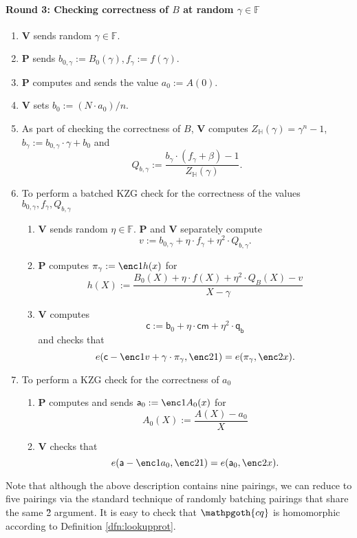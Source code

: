 \documentclass[11pt]{article} %
\newcommand{\cq}{\ensuremath{\mathpgoth{cq} }\xspace}
\newcommand{\F}{\ensuremath{\mathbb F}\xspace}
\newcommand{\cm}{\ensuremath{\mathsf{cm}}\xspace}
\newcommand{\defeq}{:=}
\newcommand{\prv}{\ensuremath{\mathsf{\mathbf{P}}}\xspace}
\newcommand{\ver}{\ensuremath{\mathsf{\mathbf{V}}}\xspace}
\newcommand{\subspace}{\ensuremath{\mathbb{H}}\xspace}
\newcommand{\witsize}{\ensuremath{n}\xspace}
\newcommand{\tabsize}{\ensuremath{N}\xspace}
\renewcommand{\a}{\ensuremath{\mathsf{a}}\xspace}
\renewcommand{\b}{\ensuremath{\mathsf{b}_0}\xspace}
\renewcommand{\c}{\ensuremath{\mathsf{c}}\xspace}
\newcommand{\qb}{\ensuremath{\mathsf{q_b}}\xspace}
\newcommand{\gamproof}{\ensuremath{\mathsf{\pi_\gamma}}\xspace}
\newcommand{\zerproof}{\ensuremath{\mathsf{\a}_0}\xspace}
\newcommand{\bgam}{\ensuremath{b_\gamma}\xspace}
\newcommand{\bzergam}{\ensuremath{b_{0,\gamma}}\xspace}
\newcommand{\qbgam}{\ensuremath{Q_{b,\gamma}}\xspace}
\newcommand{\fgam}{\ensuremath{f_{\gamma}}\xspace}
\begin{document}
	\paragraph{\textbf{Round 3:} Checking correctness of  $B$ at random $\gamma \in \F$}
 \begin{enumerate}
\item \ver sends random $\gamma \in \F$.
\item \prv sends $\bzergam \defeq B_0(\gamma),\fgam \defeq f(\gamma)$.
\item \prv computes and sends the value $a_0\defeq A(0)$.
\item \label{step:setb0}\ver  sets $b_0\defeq (\tabsize\cdot a_0)/\witsize$.
\item\label{step:setQB} As part of checking the correctness of $B$, \ver computes $ Z_\subspace(\gamma) = \gamma^\witsize -1$, $\bgam\defeq \bzergam\cdot \gamma + b_0$ and
\[\qbgam\defeq \frac{\bgam\cdot (\fgam + \beta)-1}{Z_\subspace(\gamma)}.\]
\item To perform a batched KZG check for the correctness of the values  $\bzergam,\fgam,\qbgam$
  \begin{enumerate}
   \item \ver sends random $\eta\in \F$. \prv and \ver separately compute
   \[v\defeq \bzergam +\eta\cdot\fgam + \eta^2\cdot \qbgam.\]
   \item \prv computes $\gamproof\defeq \enc1{h(x)}$ for 
   \[h(X)\defeq \frac{ B_0(X)+ \eta\cdot f(X) + \eta^2\cdot Q_B(X) -v}{X-\gamma}\]
   \item\label{step:checkKZG1} \ver computes 
   \[\c\defeq \b+\eta\cdot \cm +\eta^2\cdot \qb\]
   and checks that 
   \[e(\c-\enc1{v}+\gamma\cdot \gamproof,\enc2{1})=e(\gamproof,\enc2{x}).\]
  \end{enumerate}
\item To perform a KZG check for the correctness of $a_0$
  \begin{enumerate}
   \item \prv computes and sends $\zerproof\defeq \enc1{A_0(x)}$ for 
   \[A_0(X)\defeq \frac{A(X)-a_0}{X}\]
   \item\label{step:checkKZG2} \ver checks that 
   \[e(\a-\enc1{a_0},\enc2{1})=e(\zerproof,\enc2{x}).\]
  \end{enumerate}

\end{enumerate}

Note that although the above description contains nine pairings, we can reduce to five pairings via the standard technique of randomly batching
pairings that share the same \G2 argument. It is easy to check that \cq is homomorphic according to Definition \ref{dfn:lookupprot}.
                     
\end{document}
